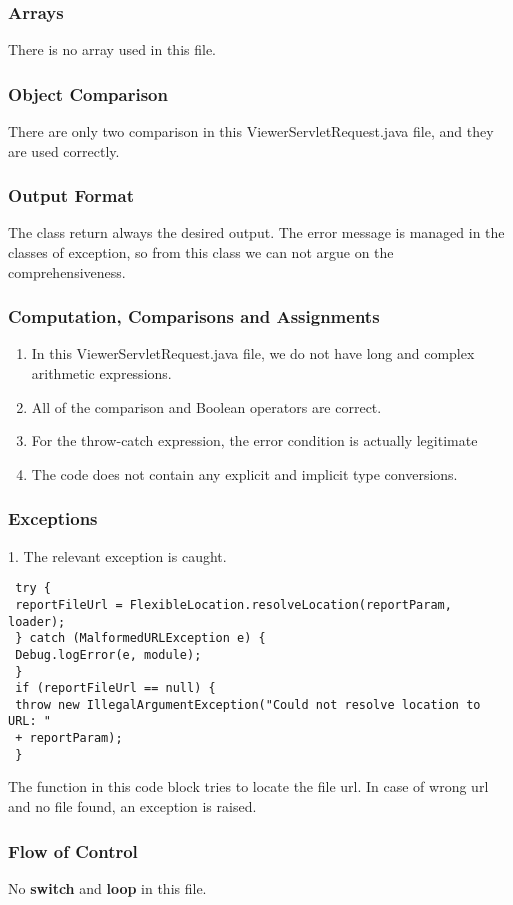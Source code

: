 \documentclass{article}
\begin{document}
\subsubsection{Arrays}
There is no array used in this file.

\subsubsection{Object Comparison}
There are only two comparison in this ViewerServletRequest.java file, and they are used correctly.

\subsubsection{Output Format}
The class return always the desired output.
The error message is managed in the classes of exception, so from this class we can not argue on the comprehensiveness.

\subsubsection{Computation, Comparisons and Assignments}
\begin{enumerate}
	\item In this ViewerServletRequest.java file, we do not have long and complex arithmetic expressions.
	\item All of the comparison and Boolean operators are correct.
	\item For the throw-catch expression, the error condition is actually legitimate
	\item The code does not contain any explicit and implicit type conversions.
\end{enumerate}
 \subsubsection{Exceptions}
 1. The relevant exception is caught. 
 \begin{verbatim}
 try {
 reportFileUrl = FlexibleLocation.resolveLocation(reportParam, loader);
 } catch (MalformedURLException e) {
 Debug.logError(e, module);
 }
 if (reportFileUrl == null) {
 throw new IllegalArgumentException("Could not resolve location to URL: " 
 + reportParam);
 }
 \end{verbatim}
 The function in this code block tries to locate the file url. In case of wrong url and no file found, an exception is raised.
 \subsubsection{Flow of Control}
 No \textbf{switch} and \textbf{loop} in this file.
\end{document}
